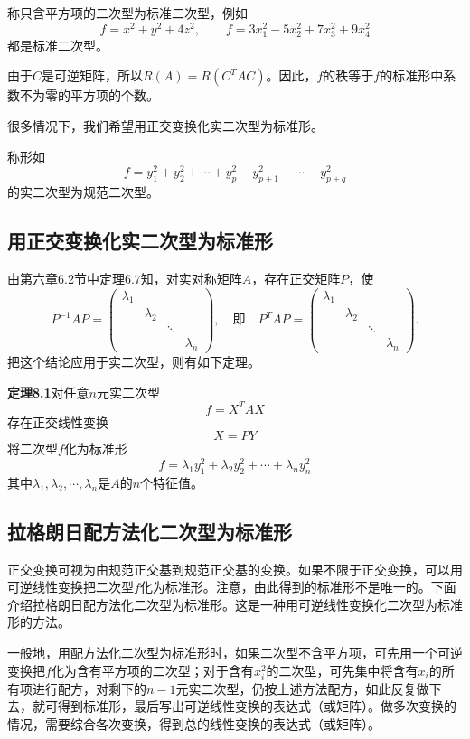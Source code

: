 称只含平方项的二次型为标准二次型，例如
\[
f=x^2+y^2+4z^2,\qquad f=3x_1^2-5x_2^2+7x_3^2+9x_4^2
\]
都是标准二次型。

由于$C$是可逆矩阵，所以$R(A)=R(C^TAC)$。因此，$f$的秩等于$f$的标准形中系数不为零的平方项的个数。

很多情况下，我们希望用正交变换化实二次型为标准形。

称形如
\[
f=y_1^2+y_2^2+\cdots+y_p^2-y_{p+1}^2-\cdots-y_{p+q}^2
\]
的实二次型为规范二次型。

\subsection{用正交变换化实二次型为标准形}
由第六章6.2节中定理6.7知，对实对称矩阵$A$，存在正交矩阵$P$，使
\[
P^{-1} A P =
\begin{pmatrix}
\lambda_1 & & & \\
& \lambda_2 & & \\
& & \ddots & \\
& & & \lambda_n
\end{pmatrix},
\quad\text{即}\quad
P^T A P =
\begin{pmatrix}
\lambda_1 & & & \\
& \lambda_2 & & \\
& & \ddots & \\
& & & \lambda_n
\end{pmatrix}.
\]
把这个结论应用于实二次型，则有如下定理。

\textbf{定理8.1}\quad 对任意$n$元实二次型
\[
f=X^TAX
\]
存在正交线性变换
\[
X=PY
\]
将二次型$f$化为标准形
\[
f=\lambda_1y_1^2+\lambda_2y_2^2+\cdots+\lambda_ny_n^2
\]
其中$\lambda_1,\lambda_2,\cdots,\lambda_n$是$A$的$n$个特征值。

\subsection{拉格朗日配方法化二次型为标准形}
正交变换可视为由规范正交基到规范正交基的变换。如果不限于正交变换，可以用可逆线性变换把二次型$f$化为标准形。注意，由此得到的标准形不是唯一的。下面介绍拉格朗日配方法化二次型为标准形。这是一种用可逆线性变换化二次型为标准形的方法。

一般地，用配方法化二次型为标准形时，如果二次型不含平方项，可先用一个可逆变换把$f$化为含有平方项的二次型；对于含有$x_i^2$的二次型，可先集中将含有$x_i$的所有项进行配方，对剩下的$n-1$元实二次型，仍按上述方法配方，如此反复做下去，就可得到标准形，最后写出可逆线性变换的表达式（或矩阵）。做多次变换的情况，需要综合各次变换，得到总的线性变换的表达式（或矩阵）。


